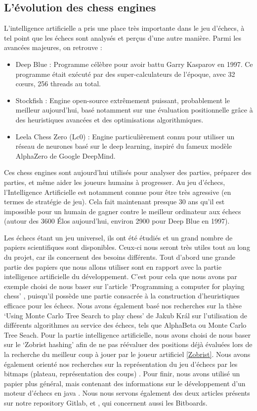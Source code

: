 \documentclass{article}
\begin{document}
\subsection{L’évolution des chess engines}
L’intelligence artificielle a pris une place très importante dans le jeu d'échecs, à tel point que les échecs
sont analysés et perçus d'une autre manière. Parmi les avancées majeures, on retrouve :
\begin{itemize}
    \item Deep Blue : Programme célèbre pour avoir battu Garry Kasparov en 1997. Ce programme était exécuté par des super-calculateurs
    de l'époque, avec 32 cœurs, 256 threads au total.
    \item Stockfish : Engine open-source extrêmement puissant, probablement le meilleur aujourd'hui, basé notamment sur une évaluation positionnelle
    grâce à des heuristiques avancées et des optimisations algorithmiques.
    \item Leela Chess Zero (Lc0) : Engine particulièrement connu pour utiliser un réseau de neurones basé sur le deep learning, inspiré du fameux
    modèle AlphaZero de Google DeepMind.
\end{itemize}
Ces chess engines sont aujourd’hui utilisés pour analyser des parties, préparer des parties, et même aider les
joueurs humains à progresser. Au jeu d'échecs, l'Intelligence Artificielle est notamment connue pour être très agressive
(en termes de stratégie de jeu). Cela fait maintenant presque 30 ans qu'il est impossible pour un humain de gagner contre
le meilleur ordinateur aux échecs (autour des 3600 Élos aujourd'hui, environ 2900 pour Deep Blue en 1997).

Les échecs étant un jeu universel, ils ont été étudiés et un grand nombre de papiers scientifiques
sont disponibles. Ceux-ci nous seront très utiles tout au long du projet, car ils concernent des
besoins différents. Tout d'abord une grande partie des papiers que nous allons utiliser sont en rapport
avec la partie intelligence artificielle du développement. C'est pour cela que nous avons par exemple
choisi de nous baser sur l'article `Programming a computer for playing chess' \cite{Shannon1950}, 
puisqu'il possède une partie consacrée à la construction d'heuristiques efficace pour les échecs.
Nous avons également basé nos recherches sur la thèse `Using Monte Carlo Tree Search to play chess' \cite{Kral2021}
de Jakub Král sur l'utilisation de différents algorithmes au service des échecs, tels que AlphaBeta ou
Monte Carlo Tree Seach. Pour la partie intelligence artificielle, nous avons choisi de nous baser sur le 
`Zobrist hashing' \cite{ZobristHashing} afin de ne pas réévaluer des positions déjà évaluées lors de la 
recherche du meilleur coup à jouer par le joueur artificiel \ref{Zobrist}. Nous avons également orienté
nos recherches sur la représentation du jeu d'échecs par les bitmaps (plateau, représentation des coups) \cite{Bijl2021}.
Pour finir, nous avons utilisé un papier plus général, mais contenant des informations sur le développement
d'un moteur d'échecs en java \cite{PaulDailly}. Nous nous servons également des deux articles présents sur 
notre repository Gitlab, \cite{Bitboards} et \cite{GameBitboards}, qui concernent aussi les Bitboards.
\end{document}
